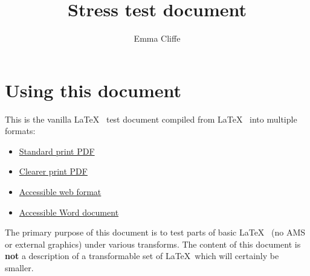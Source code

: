 \documentclass[12pt,a4paper]{article}
\title{Stress test document}
\author{Emma Cliffe}
\begin{document}
\maketitle

\tableofcontents
\listoffigures
\listoftables
\newpage

\setcounter{page}{1}

\section*{Using this document}

This is the vanilla \LaTeX~ test document compiled from \LaTeX~ into multiple formats:
\begin{itemize} 
\item \href{https://stem-enable.github.io/LaTeXtoPDFandMathJax-VanillaStressTest/LaTeXtoPDFandMathJax-VanillaStressTest-standard.pdf}{Standard print PDF}
\item \href{https://stem-enable.github.io/LaTeXtoPDFandMathJax-VanillaStressTest/LaTeXtoPDFandMathJax-VanillaStressTest-clear.pdf}{Clearer print PDF}
\item \href{https://stem-enable.github.io/LaTeXtoPDFandMathJax-VanillaStressTest/}{Accessible web format}
\item \href{https://stem-enable.github.io/LaTeXtoPDFandMathJax-VanillaStressTest/LaTeXtoPDFandMathJax-VanillaStressTest.docx}{Accessible Word document}
\end{itemize}

The primary purpose of this document is to test parts of basic \LaTeX~ (no AMS or external graphics) under various transforms. The content of this document is {\bf not} a description of a transformable set of \LaTeX~which will certainly be smaller.  

\newpage
\end{document}
